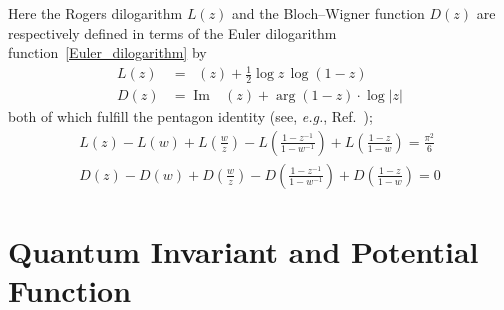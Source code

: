 \documentclass[12pt,reqno]{amsart}
\numberwithin{equation}{section}
\renewcommand{\Im}{\operatorname{Im}}
\DeclareMathOperator{\Li}{Li_2}
\begin{document}
Here
the Rogers dilogarithm $L(z)$ and the
Bloch--Wigner  function $D(z)$
are respectively defined  in terms of the Euler dilogarithm
function~\eqref{Euler_dilogarithm} by
\begin{align}
  L(z)
  & =
  \Li(z) + \frac{1}{2} \log z \, \log(1-z) 
  \\[3mm]
%
  \label{Bloch_Wigner}
  D(z)
  & =
  \Im \, \Li(z) + \arg(1-z) \cdot \log |z| 
\end{align}
both of which fulfill the pentagon identity
(see, \emph{e.g.}, Ref.~);
\begin{gather}
  \label{Rogers_pentagon}
  L(z) - L(w)
  +
  L \left(\frac{w}{z} \right)
  - L\left( \frac{1-z^{-1}}{1- w^{-1}} \right)
  + L\left( \frac{1-z}{1-w} \right)
  =
  \frac{\pi^2}{6}
  \\[2mm]
  \label{Bloch-Wigner_pentagon}
   D(z) - D(w)
   +
   D \left(\frac{w}{z} \right)
   - D\left( \frac{1-z^{-1}}{1- w^{-1}} \right)
   + D\left( \frac{1-z}{1-w} \right)
   =0
\end{gather}


\section{Quantum Invariant and Potential Function}
\label{sec:invariant}
\end{document}
